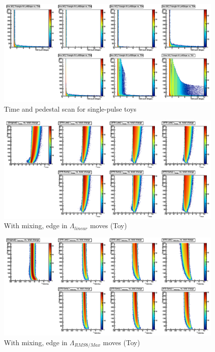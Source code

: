 \begin{figure}
   \includegraphics[width=120mm]{DailyLog/6411/6411_TimeAndPedestalScanLeftSlope.pdf}
   \caption{Time and pedestal scan for single-pulse toys}
   \label{Figure_6411_TimeAndPedestalScanLeftSlope}
\end{figure}

\begin{figure}
   \includegraphics[width=120mm]{DailyLog/6411/6411_ToysAllChargeLambdaLinear.pdf}
   \caption{With mixing, edge in $\Lambda_{linear}$ moves (Toy)}
   \label{Figure_6411_ToysAllChargeLambdaLinear}
\end{figure}

\begin{figure}
   \includegraphics[width=120mm]{DailyLog/6411/6411_ToysAllChargeLambdaRMS8Max.pdf}
   \caption{With mixing, edge in $\Lambda_{RMS8/Max}$ moves (Toy)}
   \label{Figure_6411_ToysAllChargeLambdaRMS8Max}
\end{figure}

